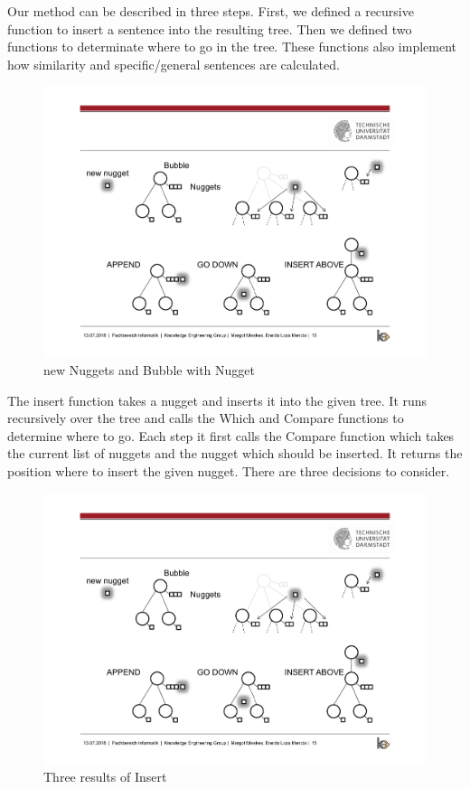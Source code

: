 Our method can be described in three steps. First, we defined a recursive function to insert a sentence into the resulting tree. Then we defined two functions to determinate where to go in the tree. These functions also implement how similarity and specific/general sentences are calculated.

\begin{figure}[H]
	\centering
	\includegraphics[trim=3cm 10cm 15cm 5.8cm, clip=true]{img/step2_func.pdf}
	\caption{new Nuggets and Bubble with Nugget}
	\label{fig:nuggetbubble}
\end{figure}

The insert function takes a nugget and inserts it into the given tree. It runs recursively over the tree and calls the Which and Compare functions to determine where to go. Each step it first calls the Compare function which takes the current list of nuggets and the nugget which should be inserted. It returns the position where to insert the given nugget. There are three decisions to consider.
\begin{figure}[H]
	\centering
	\includegraphics[trim=3.5cm 3cm 3cm 11cm, clip=true, width= \textwidth]{img/step2_func.pdf}
	\caption{Three results of Insert}
	\label{fig:insert}
\end{figure}

